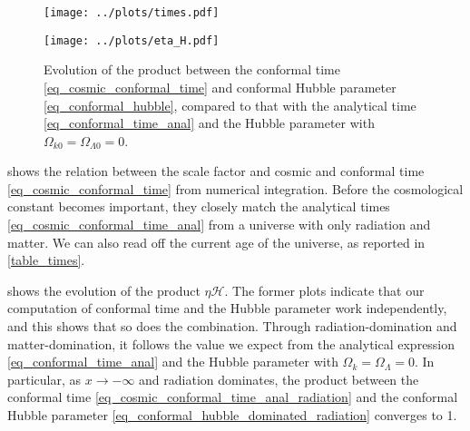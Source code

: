 \documentclass[10pt,a4paper]{article}
\begin{document}
\begin{figure}
	\centering
	\texttt{[image: ../plots/times.pdf]}
	\caption{%
		Evolution of numerically integrated cosmic and conformal times \eqref{eq_cosmic_conformal_time} in the Planck 2018 cosmology \eqref{eq_planck2018},
		compared to the analytical expressions \eqref{eq_cosmic_conformal_time_anal} in a universe with no cosmological constant.
	}
	\label{fig_cosmic_conformal_time}

	\bigskip

	\texttt{[image: ../plots/eta\_H.pdf]}
	\caption{%
		Evolution of the product between the conformal time \eqref{eq_cosmic_conformal_time} and conformal Hubble parameter \eqref{eq_conformal_hubble},
		compared to that with the analytical time \eqref{eq_conformal_time_anal} and the Hubble parameter with $\Omega_{k0}=\Omega_{\Lambda0}=0$.
	}
	\label{fig_eta_H}
\end{figure}

 shows the relation between the scale factor and cosmic and conformal time \eqref{eq_cosmic_conformal_time} from numerical integration.
Before the cosmological constant becomes important, they closely match the analytical times \eqref{eq_cosmic_conformal_time_anal} from a universe with only radiation and matter.
We can also read off the current age of the universe, as reported in \cref{table_times}.

 shows the evolution of the product $\eta \mathcal{H}$.
The former plots indicate that our computation of conformal time and the Hubble parameter work independently,
and this shows that so does the combination.
Through radiation-domination and matter-domination,
it follows the value we expect from the analytical expression \eqref{eq_conformal_time_anal}
and the Hubble parameter with $\Omega_{k} = \Omega_\Lambda = 0$.
In particular, as $x \rightarrow -\infty$ and radiation dominates,
the product between the conformal time \eqref{eq_cosmic_conformal_time_anal_radiation}
and the conformal Hubble parameter \eqref{eq_conformal_hubble_dominated_radiation} converges to 1.
\end{document}
